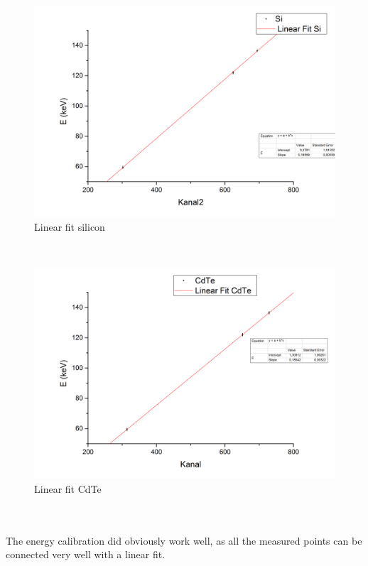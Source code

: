 \begin{figure}[h]
\begin{center}
\includegraphics[scale=0.35]{Bilder/linfit_Si.png}\caption{Linear fit silicon}\label{linfit_Si}
\end{center}
\end{figure}\\
\begin{figure}[h]
\begin{center}
\includegraphics[scale=0.35]{Bilder/linfit_CdTe.png}\caption{Linear fit CdTe}\label{linfit_CdTe}
\end{center}
\end{figure}\\
\\
The energy calibration did obviously work well, as all the measured points can be connected very well with a linear fit.\\
